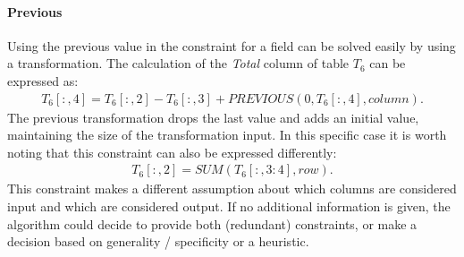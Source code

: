 \documentclass[a4paper]{article}
\newcommand{\range}[3]{#1[#2,#3]}
\newcommand{\rangeto}[2]{#1{:}#2}
\newcommand{\rangeall}{:}
\begin{document}
\paragraph{Previous} Using the previous value in the constraint for a field can be solved easily by using a transformation.
The calculation of the \textit{Total} column of table $T_6$ can be expressed as:
\begin{align}
	\range{T_6}{\rangeall}{4} = \range{T_6}{\rangeall}{2} - \range{T_6}{\rangeall}{3} + \mathit{PREVIOUS}(0, \range{T_6}{\rangeall}{4}, column).
\end{align}
The previous transformation drops the last value and adds an initial value, maintaining the size of the transformation input.
In this specific case it is worth noting that this constraint can also be expressed differently:
\begin{align}
	\range{T_6}{\rangeall}{2} = \mathit{SUM}(\range{T_6}{\rangeall}{\rangeto{3}{4}}, row).
\end{align}
This constraint makes a different assumption about which columns are considered input and which are considered output.
If no additional information is given, the algorithm could decide to provide both (redundant) constraints, or make a decision based on generality / specificity or a heuristic.
\end{document}
